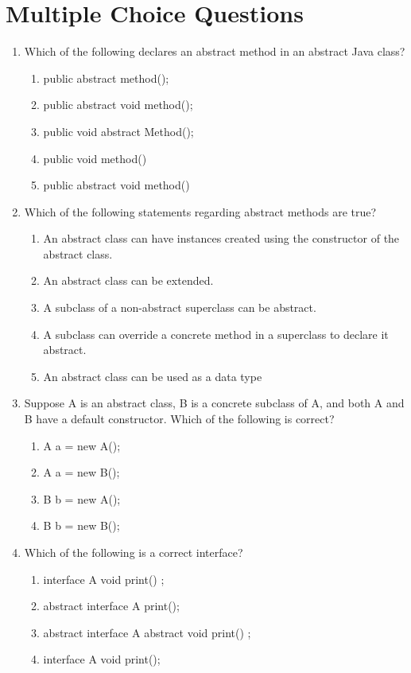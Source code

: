 \documentclass[11pt,a4paper]{article}
\begin{document}
\section*{Multiple Choice Questions}
\begin{enumerate}
    \item Which of the following declares an abstract method in an abstract Java class?
        \begin{enumerate}
            \item public abstract method();
            \item public abstract void method();
            \item public void abstract Method();
            \item public void method() {}
            \item public abstract void method() {} 
        \end{enumerate}
    \item Which of the following statements regarding abstract methods are true?
        \begin{enumerate}
            \item An abstract class can have instances created using the constructor of the abstract class.
	    \item An abstract class can be extended.
	    \item A subclass of a non-abstract superclass can be abstract.
	    \item A subclass can override a concrete method in a superclass to declare it abstract.
	    \item An abstract class can be used as a data type
        \end{enumerate}
    \item Suppose A is an abstract class, B is a concrete subclass of A, and both A and B have a default constructor. Which of the following is correct?
        \begin{enumerate}
            \item A a = new A();
	    \item A a = new B();
	    \item B b = new A();
	    \item B b = new B();
        \end{enumerate}
    \item Which of the following is a correct interface?
        \begin{enumerate}
            \item interface A { void print() { }; }
	    \item abstract interface A { print(); }
	    \item abstract interface A { abstract void print() { };}
	    \item interface A { void print();}
        \end{enumerate}
    

\end{enumerate}
\end{document}
